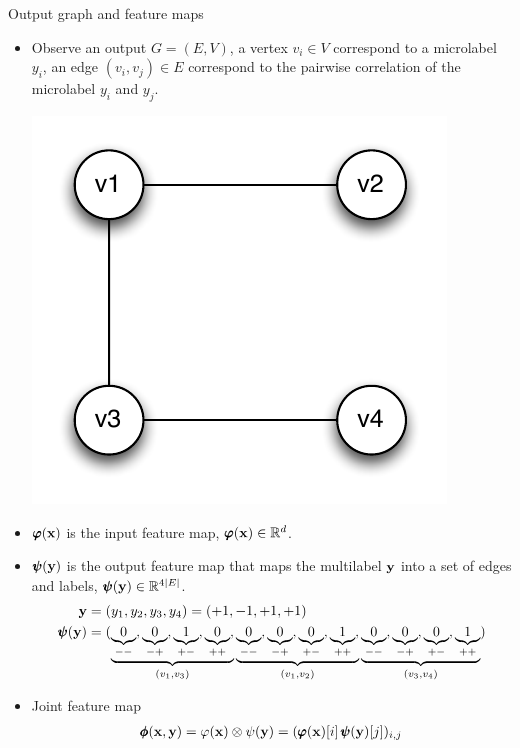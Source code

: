 \documentclass[first=dgreen,second=purple,logo=yellowexc]{aaltoslides}
\begin{document}
{\begin{frame}[allowframebreaks]{Output graph and feature maps}
	\begin{itemize}
		\item Observe an output $G=(E,V)$, a vertex $v_i\in V$ correspond to a microlabel $y_i$, an edge $(v_i,v_j)\in E$ correspond to the pairwise correlation of the microlabel $y_i$ and $y_j$.
		\begin{center}
			\includegraphics[scale=0.3]{./figures/outputgraph.pdf}
		\end{center}
		\item $\pmb \varphi(\mathbf {x})$ is the  input feature map, $\pmb \varphi(\mathbf {x})\in\mathbb{R}^d$.
		\item $\pmb \psi(\mathbf {y})$ is the output feature map that maps the multilabel $\mathbf {y}$ into a set of edges and labels, $\pmb \psi(\mathbf {y})\in\mathbb{R}^{4|E|}$.
		\begin{align*}
			\mathbf {y}&=(y_1,y_2,y_3,y_4)=(+1,-1,+1,+1)\\
			\pmb \psi(\mathbf {y}) &= ( \underbrace{\underbrace{0}_{--}, \underbrace{0}_{-+}, \underbrace{1}_{+-}, \underbrace{0}_{++},}_{(v_1,v_3)} 
			\underbrace{\underbrace{0}_{--}, \underbrace{0}_{-+}, \underbrace{0}_{+-}, \underbrace{1}_{++},}_{(v_1,v_2)}
			\underbrace{\underbrace{0}_{--}, \underbrace{0}_{-+}, \underbrace{0}_{+-}, \underbrace{1}_{++}}_{(v_3,v_4)})
		\end{align*}
		\framebreak
		\item Joint feature map
		\begin{align*}
			\pmb \phi(\mathbf {x},\mathbf {y}) = \varphi(\mathbf {x})\otimes\psi(\mathbf {y}) = (\pmb \varphi(\mathbf {x})[i]\,\pmb \psi(\mathbf {y})[j])_{i,j}
		\end{align*} 

\end{itemize}
\end{frame}}
\end{document}
